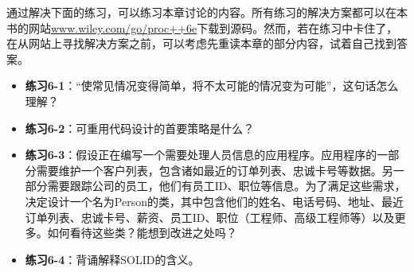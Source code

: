 通过解决下面的练习，可以练习本章讨论的内容。所有练习的解决方案都可以在本书的网站\url{www.wiley.com/go/proc++6e}下载到源码。然而，若在练习中卡住了，在从网站上寻找解决方案之前，可以考虑先重读本章的部分内容，试着自己找到答案。

\begin{itemize}
\item
\textbf{练习6-1}：“使常见情况变得简单，将不太可能的情况变为可能”，这句话怎么理解？

\item
\textbf{练习6-2}：可重用代码设计的首要策略是什么？

\item
\textbf{练习6-3}：假设正在编写一个需要处理人员信息的应用程序。应用程序的一部分需要维护一个客户列表，包含诸如最近的订单列表、忠诚卡号等数据。另一部分需要跟踪公司的员工，他们有员工ID、职位等信息。为了满足这些需求，决定设计一个名为Person的类，其中包含他们的姓名、电话号码、地址、最近订单列表、忠诚卡号、薪资、员工ID、职位（工程师、高级工程师等）以及更多。如何看待这些类？能想到改进之处吗？

\item
\textbf{练习6-4}：背诵解释SOLID的含义。
\end{itemize}